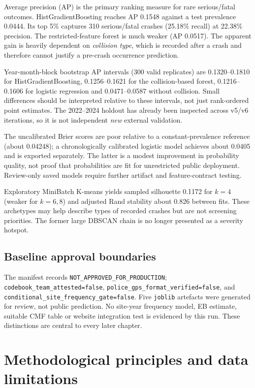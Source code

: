 \documentclass[11pt,a4paper,openany]{report}
\newcommand{\pathcode}[1]{\nolinkurl{#1}}
\begin{document}
Average precision (AP) is the primary ranking measure for rare serious/fatal outcomes. HistGradientBoosting reaches AP 0.1548 against a test prevalence 0.0444. Its top 5\% captures 310 serious/fatal crashes (25.18\% recall) at 22.38\% precision. The restricted-feature forest is much weaker (AP 0.0517). The apparent gain is heavily dependent on \emph{collision type}, which is recorded after a crash and therefore cannot justify a pre-crash occurrence prediction.

Year-month-block bootstrap AP intervals (300 valid replicates) are 0.1320--0.1810 for HistGradientBoosting, 0.1256--0.1621 for the collision-based forest, 0.1216--0.1606 for logistic regression and 0.0471--0.0587 without collision. Small differences should be interpreted relative to these intervals, not just rank-ordered point estimates. The 2022--2024 holdout has already been inspected across v5/v6 iterations, so it is not independent \emph{new} external validation.

The uncalibrated Brier scores are poor relative to a constant-prevalence reference (about 0.04248); a chronologically calibrated logistic model achieves about 0.0405 and is exported separately. The latter is a modest improvement in probability quality, not proof that probabilities are fit for unrestricted public deployment. Review-only saved models require further artifact and feature-contract testing.

Exploratory MiniBatch K-means yields sampled silhouette 0.1172 for $k=4$ (weaker for $k=6,8$) and adjusted Rand stability about 0.826 between fits. These archetypes may help describe types of recorded crashes but are not screening priorities. The former large DBSCAN chain is no longer presented as a severity hotspot.

\section{Baseline approval boundaries}
The manifest records \pathcode{NOT_APPROVED_FOR_PRODUCTION}; \pathcode{codebook_team_attested=false}, \pathcode{police_gps_format_verified=false}, and \pathcode{conditional_site_frequency_gate=false}. Five \pathcode{joblib} artefacts were generated for review, not public prediction. No site-year frequency model, EB estimate, suitable CMF table or website integration test is evidenced by this run. These distinctions are central to every later chapter.

\chapter{Methodological principles and data limitations}
\end{document}
